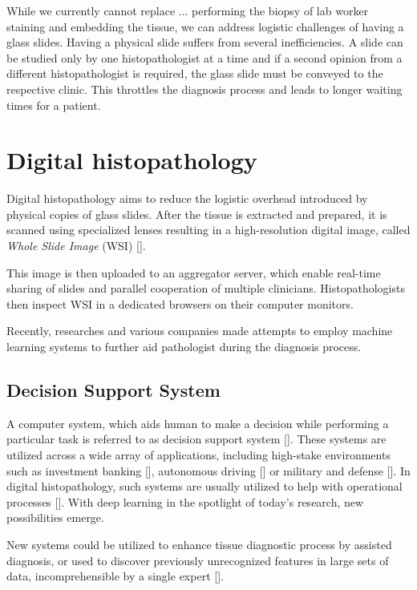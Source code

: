 While we currently cannot replace ... performing the biopsy of lab worker staining and embedding the tissue, we can address logistic challenges of having a glass slides. Having a physical slide suffers from several inefficiencies. A slide can be studied only by one histopathologist at a time and if a second opinion from a different histopathologist is required, the glass slide must be conveyed to the respective clinic. This throttles the diagnosis process and leads to longer waiting times for a patient.

\section{Digital histopathology}

Digital histopathology aims to reduce the logistic overhead introduced by physical copies of glass slides. After the tissue is extracted and prepared, it is scanned using specialized lenses resulting in a high-resolution digital image, called \emph{Whole Slide Image} (WSI) [].

This image is then uploaded to an aggregator server, which enable real-time sharing of slides and parallel cooperation of multiple clinicians. Histopathologists then inspect WSI in a dedicated browsers on their computer monitors.


Recently, researches and various companies made attempts to employ machine learning systems to further aid pathologist during the diagnosis process. 

\subsection*{Decision Support System}

A computer system, which aids human to make a decision while performing a particular task is referred to as decision support system []. These systems are utilized across a wide array of applications, including high-stake environments such as investment banking [], autonomous driving [] or military and defense []. In digital histopathology, such systems are usually utilized to help with operational processes []. With deep learning in the spotlight of today's research, new possibilities emerge.

New systems could be utilized to enhance tissue diagnostic process by assisted diagnosis, or used to discover previously unrecognized features in large sets of data, incomprehensible by a single expert [].

